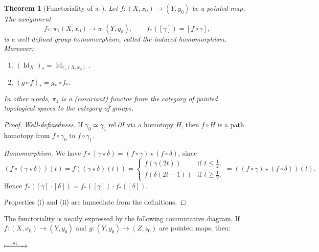 \documentclass[12pt,a4paper,openany]{book}
\theoremstyle{definition}
\theoremstyle{plain}
\newtheorem{theorem}[definition]{Theorem}
\theoremstyle{remark}
\DeclareMathOperator{\Id}{Id}
\newcommand{\rel}{\operatorname{rel}}
\begin{document}
\begin{theorem}[Functoriality of $\pi_1$]\label{thm:pi1-functor}
Let $f \colon (X, x_0) \to (Y, y_0)$ be a pointed map. The assignment
\[
  f_* \colon \pi_1(X, x_0) \to \pi_1(Y, y_0), \qquad f_*([\gamma]) = [f \circ \gamma],
\]
is a well-defined group homomorphism, called the \emph{induced
homomorphism}. Moreover:
\begin{enumerate}[label=(\roman*)]
\item $(\Id_X)_* = \Id_{\pi_1(X, x_0)}$.
\item $(g \circ f)_* = g_* \circ f_*$.
\end{enumerate}
In other words, $\pi_1$ is a (covariant) functor from the category of pointed
topological spaces to the category of groups.
\end{theorem}

\begin{proof}
\emph{Well-definedness.} If $\gamma_0 \simeq \gamma_1 \rel{\partial I}$ via a
homotopy $H$, then $f \circ H$ is a path homotopy from $f \circ \gamma_0$ to
$f \circ \gamma_1$.

\emph{Homomorphism.} We have $f \circ (\gamma \star \delta) = (f \circ \gamma)
\star (f \circ \delta)$, since
\[
  (f \circ (\gamma \star \delta))(t) = f((\gamma \star \delta)(t)) =
  \begin{cases}
    f(\gamma(2t)) & \text{if } t \le \tfrac{1}{2}, \\
    f(\delta(2t-1)) & \text{if } t \ge \tfrac{1}{2},
  \end{cases}
  = ((f \circ \gamma) \star (f \circ \delta))(t).
\]
Hence $f_*([\gamma] \cdot [\delta]) = f_*([\gamma]) \cdot f_*([\delta])$.

Properties (i) and (ii) are immediate from the definitions.
\end{proof}

The functoriality is neatly expressed by the following commutative diagram. If
$f \colon (X, x_0) \to (Y, y_0)$ and $g \colon (Y, y_0) \to (Z, z_0)$ are
pointed maps, then:

\begin{center}
\qquad$\xmapsto{\quad \pi_1 \quad}$\qquad
{}
\label{fig:pi1-functor}
\end{center}
\end{document}
